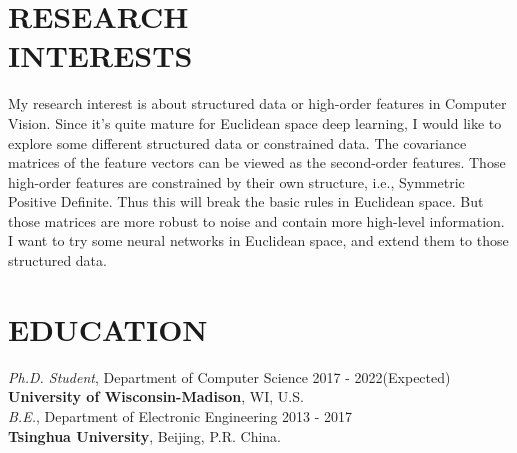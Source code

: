 \documentclass[margin]{res}
\begin{document}
\begin{resume}
\section{RESEARCH \\ INTERESTS}
                My research interest is about structured data or high-order features in Computer Vision. Since it's quite mature for Euclidean space deep learning, I would like to explore some different structured data or constrained data. The covariance matrices of the feature vectors can be viewed as the second-order features. Those high-order features are constrained by their own structure, i.e., Symmetric Positive Deﬁnite. Thus this will break the basic rules in Euclidean space. But those matrices are more robust to noise and contain more high-level information. I want to try some neural networks in Euclidean space, and extend them to those structured data.

\section{EDUCATION} 
                {\sl {Ph.D. Student}}, Department of Computer Science \hfill 2017 - 2022(Expected)\\
                {\bf University of Wisconsin-Madison}, WI, U.S. \\
                {\sl {B.E.}}, Department of Electronic Engineering \hfill 2013 - 2017\\
                {\bf Tsinghua University}, Beijing, P.R. China. 


\end{resume}
\end{document}
